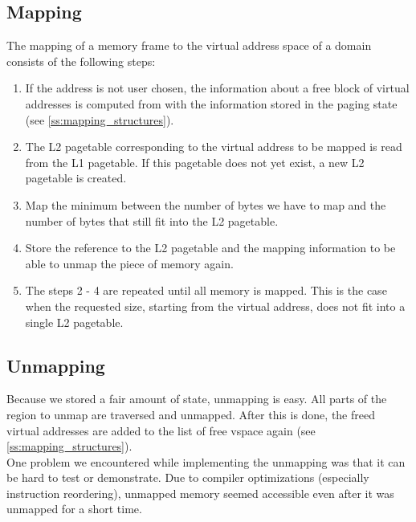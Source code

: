 \subsection{Mapping}
The mapping of a memory frame to the virtual address space of a domain consists of the following steps:
\begin{enumerate}
	\item If the address is not user chosen, the information about a free block of virtual addresses is computed from with the information stored in the paging state (see \ref{ss:mapping_structures}).
	\item The L2 pagetable corresponding to the virtual address to be mapped is read from the L1 pagetable. If this pagetable does not yet exist, a new L2 pagetable is created.
	\item Map the minimum between the number of bytes we have to map and the number of bytes that still fit into the L2 pagetable.
	\item Store the reference to the L2 pagetable and the mapping information to be able to unmap the piece of memory again. 
	\item The steps 2 - 4 are repeated until all memory is mapped. This is the case when the requested size, starting from the virtual address, does not fit into a single L2 pagetable.
\end{enumerate}

\subsection{Unmapping}
Because we stored a fair amount of state, unmapping is easy. All parts of the region to unmap are traversed and unmapped. After this is done, the freed virtual addresses are added to the list of free vspace again (see \ref{ss:mapping_structures}).\\
One problem we encountered while implementing the unmapping was that it can be hard to test or demonstrate. Due to compiler optimizations (especially instruction reordering), unmapped memory seemed accessible even after it was unmapped for a short time.

